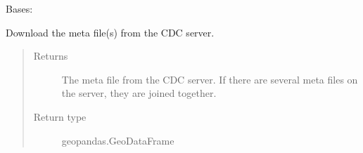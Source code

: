 \documentclass[letterpaper,10pt,english]{sphinxmanual}
\begin{document}
\begin{fulllineitems}
\label{\detokenize{weatherDB:weatherDB.stations.StationsBase}}
\sphinxAtStartPar
Bases: 

\begin{fulllineitems}
\label{\detokenize{weatherDB:weatherDB.stations.StationsBase.__init__}}
\end{fulllineitems}


\begin{fulllineitems}
\label{\detokenize{weatherDB:weatherDB.stations.StationsBase.download_meta}}
\sphinxAtStartPar
Download the meta file(s) from the CDC server.
\begin{quote}\begin{description}
\item[{Returns}] \leavevmode
\sphinxAtStartPar
The meta file from the CDC server.
If there are several meta files on the server, they are joined together.

\item[{Return type}] \leavevmode
\sphinxAtStartPar
geopandas.GeoDataFrame

\end{description}\end{quote}

\end{fulllineitems}



\end{fulllineitems}
\end{document}
